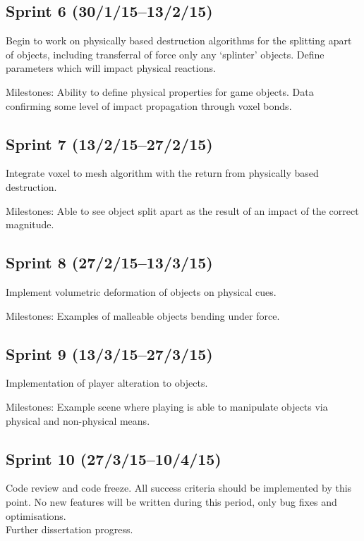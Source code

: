 \subsection*{Sprint 6 (30/1/15--13/2/15)}

Begin to work on physically based destruction algorithms for the splitting apart of objects, including transferral of force only any `splinter' objects. Define parameters which will impact physical reactions.

Milestones: Ability to define physical properties for game objects. Data confirming some level of impact propagation through voxel bonds.


\subsection*{Sprint 7 (13/2/15--27/2/15)}

Integrate voxel to mesh algorithm with the return from physically based destruction.

Milestones: Able to see object split apart as the result of an impact of the correct magnitude.


\subsection*{Sprint 8 (27/2/15--13/3/15)}

Implement volumetric deformation of objects on physical cues.

Milestones: Examples of malleable objects bending under force.


\subsection*{Sprint 9 (13/3/15--27/3/15)}

Implementation of player alteration to objects.

Milestones: Example scene where playing is able to manipulate objects via physical and non-physical means.


\subsection*{Sprint 10 (27/3/15--10/4/15)}

Code review and code freeze. All success criteria should be implemented by this point. No new features will be written during this period, only bug fixes and optimisations.\\
Further dissertation progress.



